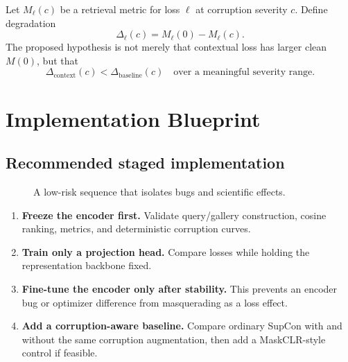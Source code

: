\documentclass[11pt,oneside,openany]{book}
\theoremstyle{myplain}
\theoremstyle{definition}
\begin{document}
Let $M_\ell(c)$ be a retrieval metric for loss $\ell$ at corruption severity $c$. Define degradation
\begin{equation}
  \Delta_\ell(c)=M_\ell(0)-M_\ell(c).
  \label{eq:degradation}
\end{equation}
The proposed hypothesis is not merely that contextual loss has larger clean $M(0)$, but that
\begin{equation}
  \Delta_{\mathrm{context}}(c)
  <\Delta_{\mathrm{baseline}}(c)
  \quad\text{over a meaningful severity range.}
  \label{eq:hypothesis}
\end{equation}

\chapter{Implementation Blueprint}
\label{chap:implementation}

\section{Recommended staged implementation}

\begin{figure}[H]
\centering
{}
\caption{A low-risk sequence that isolates bugs and scientific effects.}
\label{fig:stages}
\end{figure}

\begin{enumerate}[leftmargin=*,itemsep=5pt]
  \item \textbf{Freeze the encoder first.} Validate query/gallery construction, cosine ranking, metrics, and deterministic corruption curves.
  \item \textbf{Train only a projection head.} Compare losses while holding the representation backbone fixed.
  \item \textbf{Fine-tune the encoder only after stability.} This prevents an encoder bug or optimizer difference from masquerading as a loss effect.
  \item \textbf{Add a corruption-aware baseline.} Compare ordinary SupCon with and without the same corruption augmentation, then add a MaskCLR-style control if feasible.
\end{enumerate}
\end{document}
